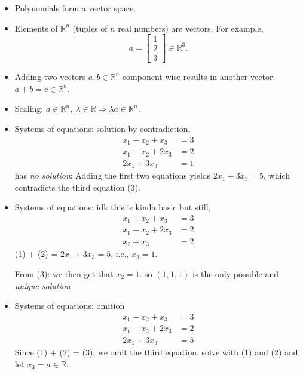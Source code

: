 \documentclass[12pt, letterpaper]{article}
\begin{document}
\begin{itemize}
  \item Polynomials form a vector space.

  \item Elements of $\mathbb{R}^n$ (tuples of $n$ real numbers) are vectors.
  For example,
    \[
      a = \begin{bmatrix}
        1\\2\\3
      \end{bmatrix} \in \mathbb{R}^3.
    \]

  \item Adding two vectors $a,b \in \mathbb{R}^n$ component-wise results
  in another vector: $a+b=c \in \mathbb{R}^n$.

  \item Scaling: $a \in \mathbb{R}^n,\ \lambda \in \mathbb{R}
  \Longrightarrow \lambda a \in \mathbb{R}^n$.

  \item Systems of equations: solution by contradiction,
    \begin{align}
      x_1 + x_2 + x_3 &= 3 \tag{1}\\
      x_1 - x_2 + 2x_3 &= 2 \tag{2}\\
      2x_1 + 3x_3 &= 1 \tag{3}
    \end{align}
  has \emph{no solution}: Adding the first two equations yields
  $2x_1 + 3x_3 = 5$, which contradicts the third equation (3).

  \item Systems of equations: idk this is kinda basic but still,
    \begin{align}
      x_1 + x_2 + x_3 &= 3 \tag{1}\\
      x_1 - x_2 + 2x_3 &= 2 \tag{2}\\
      x_2 + x_3 &= 2 \tag{3}
    \end{align}
  (1) + (2) = $2x_1 + 3x_3 = 5$, i.e., $x_3 = 1$.

  From (3): we then get that $x_2 = 1$. so $(1,1,1)$ is the
  only possible and \emph{unique solution}

  \item Systems of equations: omition
    \begin{align}
      x_1 + x_2 + x_3 &= 3 \tag{1}\\
      x_1 - x_2 + 2x_3 &= 2 \tag{2}\\
      2x_1 + 3x_3 &= 5 \tag{3}
    \end{align}
    Since (1) + (2) = (3), we omit the third equation. solve with (1) and (2)
    and let $x_3 = a \in \mathbb{R}$.


\end{itemize}
\end{document}
